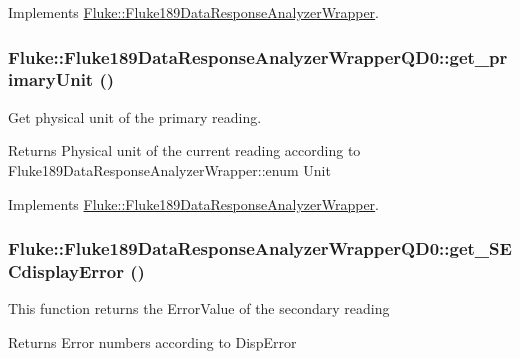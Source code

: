 Implements \hyperlink{classFluke_1_1Fluke189DataResponseAnalyzerWrapper_afb7361d6963bb0edd9194ba72a1583df}{Fluke::Fluke189DataResponseAnalyzerWrapper}.\hypertarget{classFluke_1_1Fluke189DataResponseAnalyzerWrapperQD0_af71dd62d9f81866ad3cb96c580754329}{
\subsubsection[{get\_\-primaryUnit}]{ Fluke::Fluke189DataResponseAnalyzerWrapperQD0::get\_\-primaryUnit ()}}
\label{classFluke_1_1Fluke189DataResponseAnalyzerWrapperQD0_af71dd62d9f81866ad3cb96c580754329}
Get physical unit of the primary reading. \begin{DoxyReturn}{Returns}
Physical unit of the current reading according to Fluke189DataResponseAnalyzerWrapper::enum Unit 
\end{DoxyReturn}


Implements \hyperlink{classFluke_1_1Fluke189DataResponseAnalyzerWrapper_a81fd0f497095dba37f2a614bd35426db}{Fluke::Fluke189DataResponseAnalyzerWrapper}.\hypertarget{classFluke_1_1Fluke189DataResponseAnalyzerWrapperQD0_a26e5925f4ca96aeea4115c44aa8ed1a8}{
\subsubsection[{get\_\-SECdisplayError}]{ Fluke::Fluke189DataResponseAnalyzerWrapperQD0::get\_\-SECdisplayError ()}}
\label{classFluke_1_1Fluke189DataResponseAnalyzerWrapperQD0_a26e5925f4ca96aeea4115c44aa8ed1a8}
This function returns the ErrorValue of the secondary reading \begin{DoxyReturn}{Returns}
Error numbers according to DispError 
\end{DoxyReturn}


